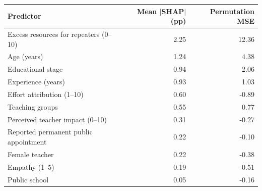 \begin{tabular}{lrr}
\toprule
Predictor & Mean $|$SHAP$|$ (pp) & Permutation MSE \\
\midrule
Excess resources for repeaters (0--10) & 2.25 & 12.36 \\
Age (years) & 1.24 & 4.38 \\
Educational stage & 0.94 & 2.06 \\
Experience (years) & 0.93 & 1.03 \\
Effort attribution (1--10) & 0.60 & -0.89 \\
Teaching groups & 0.55 & 0.77 \\
Perceived teacher impact (0--10) & 0.31 & -0.27 \\
Reported permanent public appointment & 0.22 & -0.10 \\
Female teacher & 0.22 & -0.38 \\
Empathy (1--5) & 0.19 & -0.51 \\
Public school & 0.05 & -0.16 \\
\bottomrule
\end{tabular}
